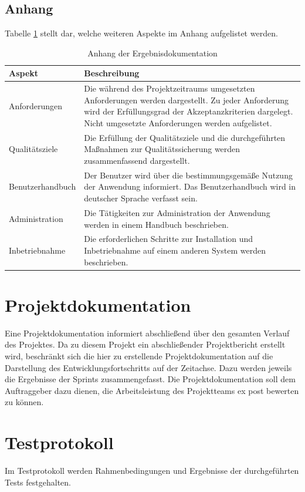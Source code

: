 \documentclass[a4paper,11pt,listof=numbered,glossary=totoc,parskip=half,toc=bib]{scrreprt}
\begin{document}
	\subsection{Anhang}
	Tabelle \ref{tab:ergebnisdokumentation_anhang} stellt dar, welche weiteren Aspekte im Anhang aufgelistet werden.
	\begin{table}
		\centering
		\begin{tabularx}{\textwidth}{lX}
			\toprule
			\textbf{Aspekt} & \textbf{Beschreibung} \\
			\midrule
			Anforderungen & Die während des Projektzeitraums umgesetzten Anforderungen werden dargestellt. Zu jeder Anforderung wird der Erfüllungsgrad der Akzeptanzkriterien dargelegt. Nicht umgesetzte Anforderungen werden aufgelistet. \\
			Qualitätsziele & Die Erfüllung der Qualitätsziele und die durchgeführten Maßnahmen zur Qualitätssicherung werden zusammenfassend dargestellt. \\
			Benutzerhandbuch & Der Benutzer wird über die bestimmungsgemäße Nutzung der Anwendung informiert. Das Benutzerhandbuch wird in deutscher Sprache verfasst sein. \\
			Administration & Die Tätigkeiten zur Administration der Anwendung werden in einem Handbuch beschrieben. \\
			Inbetriebnahme & Die erforderlichen Schritte zur Installation und Inbetriebnahme auf einem anderen System werden beschrieben. \\
			\bottomrule
		\end{tabularx}
		\caption{Anhang der Ergebnisdokumentation}
		\label{tab:ergebnisdokumentation_anhang}
	\end{table}
	
	\section{Projektdokumentation}
	Eine Projektdokumentation informiert abschließend über den gesamten Verlauf des Projektes. Da zu diesem Projekt ein abschließender Projektbericht erstellt wird, beschränkt sich die hier zu erstellende Projektdokumentation auf die Darstellung des Entwicklungsfortschritts auf der Zeitachse. Dazu werden jeweils die Ergebnisse der Sprints zusammengefasst. Die Projektdokumentation soll dem Auftraggeber dazu dienen, die Arbeitsleistung des Projektteams ex post bewerten zu können.
	 
	\section{Testprotokoll}
	\label{sec:testproto}
	Im Testprotokoll werden Rahmenbedingungen und Ergebnisse der durchgeführten Tests festgehalten.
	
\end{document}
